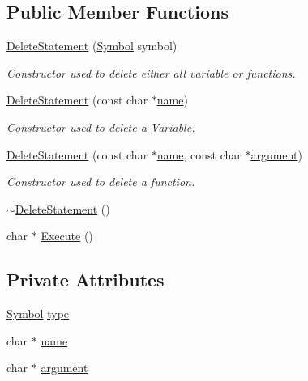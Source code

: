 \subsection*{Public Member Functions}
\begin{DoxyCompactItemize}
\item 
\hyperlink{classDeleteStatement_a335cfbb9db4b3bad5f0a082f247efcaa}{Delete\+Statement} (\hyperlink{lex_8h_a7feef761cd73fac6e25b8bb80d2c4e54}{Symbol} symbol)
\begin{DoxyCompactList}\small\item\em Constructor used to delete either all variable or functions. \end{DoxyCompactList}\item 
\hyperlink{classDeleteStatement_a9f89688d9c3193cdb7a314f981126ee2}{Delete\+Statement} (const char $\ast$\hyperlink{classDeleteStatement_aec9706bae02a354afec8f639e283e5b9}{name})
\begin{DoxyCompactList}\small\item\em Constructor used to delete a \hyperlink{classVariable}{Variable}. \end{DoxyCompactList}\item 
\hyperlink{classDeleteStatement_ae742b66f6a74b0420e8ee54c8bc4a980}{Delete\+Statement} (const char $\ast$\hyperlink{classDeleteStatement_aec9706bae02a354afec8f639e283e5b9}{name}, const char $\ast$\hyperlink{classDeleteStatement_a0fe7f24dcfd05e0f7f449e19aaabee2d}{argument})
\begin{DoxyCompactList}\small\item\em Constructor used to delete a function. \end{DoxyCompactList}\item 
\hyperlink{classDeleteStatement_aacd65756af692a14e0beaa4b64dc814a}{$\sim$\+Delete\+Statement} ()
\item 
char $\ast$ \hyperlink{classDeleteStatement_a709e8696c9ca4be32679e6a72b82de86}{Execute} ()
\end{DoxyCompactItemize}
\subsection*{Private Attributes}
\begin{DoxyCompactItemize}
\item 
\hyperlink{lex_8h_a7feef761cd73fac6e25b8bb80d2c4e54}{Symbol} \hyperlink{classDeleteStatement_a46629e67cd652c61ccabfc79c4cc8e01}{type}
\item 
char $\ast$ \hyperlink{classDeleteStatement_aec9706bae02a354afec8f639e283e5b9}{name}
\item 
char $\ast$ \hyperlink{classDeleteStatement_a0fe7f24dcfd05e0f7f449e19aaabee2d}{argument}
\end{DoxyCompactItemize}
